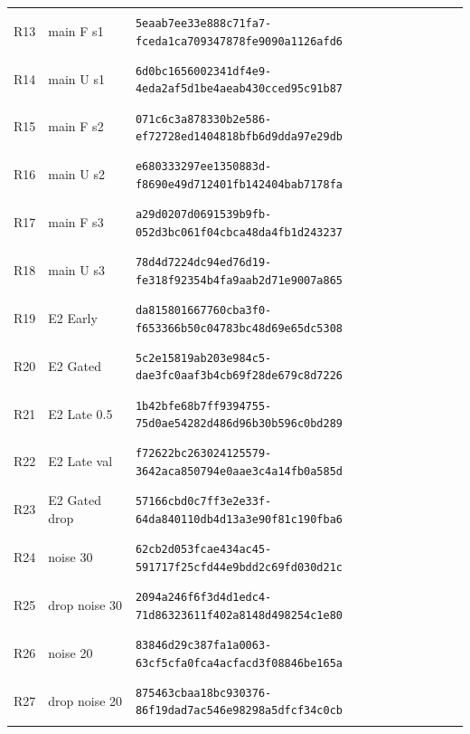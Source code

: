 \begin{longtable}{@{}l>{\raggedright\arraybackslash}p{3.5cm}p{10.8cm}@{}}
\hypertarget{R13}{R13} & main F s1 & {\fontsize{8.8}{11}\selectfont\texttt{5eaab7ee33e888c71fa7-fceda1ca709347878fe9090a1126afd6}} \\
\hypertarget{R14}{R14} & main U s1 & {\fontsize{8.8}{11}\selectfont\texttt{6d0bc1656002341df4e9-4eda2af5d1be4aeab430cced95c91b87}} \\
\hypertarget{R15}{R15} & main F s2 & {\fontsize{8.8}{11}\selectfont\texttt{071c6c3a878330b2e586-ef72728ed1404818bfb6d9dda97e29db}} \\
\hypertarget{R16}{R16} & main U s2 & {\fontsize{8.8}{11}\selectfont\texttt{e680333297ee1350883d-f8690e49d712401fb142404bab7178fa}} \\
\hypertarget{R17}{R17} & main F s3 & {\fontsize{8.8}{11}\selectfont\texttt{a29d0207d0691539b9fb-052d3bc061f04cbca48da4fb1d243237}} \\
\hypertarget{R18}{R18} & main U s3 & {\fontsize{8.8}{11}\selectfont\texttt{78d4d7224dc94ed76d19-fe318f92354b4fa9aab2d71e9007a865}} \\
\hypertarget{R19}{R19} & E2 Early & {\fontsize{8.8}{11}\selectfont\texttt{da815801667760cba3f0-f653366b50c04783bc48d69e65dc5308}} \\
\hypertarget{R20}{R20} & E2 Gated & {\fontsize{8.8}{11}\selectfont\texttt{5c2e15819ab203e984c5-dae3fc0aaf3b4cb69f28de679c8d7226}} \\
\hypertarget{R21}{R21} & E2 Late 0.5 & {\fontsize{8.8}{11}\selectfont\texttt{1b42bfe68b7ff9394755-75d0ae54282d486d96b30b596c0bd289}} \\
\hypertarget{R22}{R22} & E2 Late val & {\fontsize{8.8}{11}\selectfont\texttt{f72622bc263024125579-3642aca850794e0aae3c4a14fb0a585d}} \\
\hypertarget{R23}{R23} & E2 Gated drop & {\fontsize{8.8}{11}\selectfont\texttt{57166cbd0c7ff3e2e33f-64da840110db4d13a3e90f81c190fba6}} \\
\hypertarget{R24}{R24} & noise 30 & {\fontsize{8.8}{11}\selectfont\texttt{62cb2d053fcae434ac45-591717f25cfd44e9bdd2c69fd030d21c}} \\
\hypertarget{R25}{R25} & drop noise 30 & {\fontsize{8.8}{11}\selectfont\texttt{2094a246f6f3d4d1edc4-71d86323611f402a8148d498254c1e80}} \\
\hypertarget{R26}{R26} & noise 20 & {\fontsize{8.8}{11}\selectfont\texttt{83846d29c387fa1a0063-63cf5cfa0fca4acfacd3f08846be165a}} \\
\hypertarget{R27}{R27} & drop noise 20 & {\fontsize{8.8}{11}\selectfont\texttt{875463cbaa18bc930376-86f19dad7ac546e98298a5dfcf34c0cb}} \\

\end{longtable}
